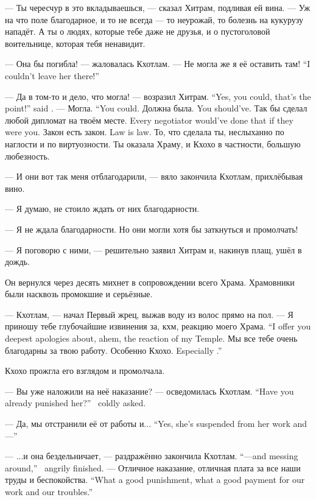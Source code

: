 --- Ты чересчур в это вкладываешься, --- сказал Хитрам, подливая ей вина.
--- Уж на что поле благодарное, и то не всегда --- то неурожай, то болезнь на кукурузу нападёт.
А ты о людях, которые тебе даже не друзья, и о пустоголовой воительнице, которая тебя ненавидит.

--- Она бы погибла! --- жаловалась Кхотлам.
{--- Не могла же я её оставить там!}
{``I couldn't leave her there!''}

{--- Да в том-то и дело, что могла! --- возразил Хитрам.}
{``Yes, you could, that's the point!'' said \Chitram.}
{--- Могла.}
{``You could.}
{Должна была.}
{You should've.}
{Так бы сделал любой дипломат на твоём месте.}
{Every negotiator would've done that if they were you.}
{Закон есть закон.}
{Law is law.}
То, что сделала ты, неслыханно по наглости и по виртуозности.
Ты оказала Храму, и Кхохо в частности, большую любезность.

--- И они вот так меня отблагодарили, --- вяло закончила Кхотлам, прихлёбывая вино.

--- Я думаю, не стоило ждать от них благодарности.

--- Я не ждала благодарности.
Но они могли хотя бы заткнуться и промолчать!

--- Я поговорю с ними, --- решительно заявил Хитрам и, накинув плащ, ушёл в дождь.

Он вернулся через десять михнет в сопровождении всего Храма.
Храмовники были насквозь промокшие и серьёзные.

--- Кхотлам, --- начал Первый жрец, выжав воду из волос прямо на пол.
{--- Я приношу тебе глубочайшие извинения за, кхм, реакцию моего Храма.}
{``I offer you deepest apologies about, ahem, the reaction of my Temple.}
Мы все тебе очень благодарны за твою работу.
{Особенно Кхохо.}
{Especially \Kchoho.''}

Кхохо прожгла его взглядом и промолчала.

{--- Вы уже наложили на неё наказание? --- осведомилась Кхотлам.}
{``Have you already punished her?'' \Kchotlam\ coldly asked.}

{--- Да, мы отстранили её от работы и...}
{``Yes, she's suspended from her work and---''}

{--- ...и она бездельничает, --- раздражённо закончила Кхотлам.}
{``---and messing around,'' \Kchotlam\ angrily finished.}
{--- Отличное наказание, отличная плата за все наши труды и беспокойства.}
{``What a good punishment, what a good payment for our work and our troubles.''}

